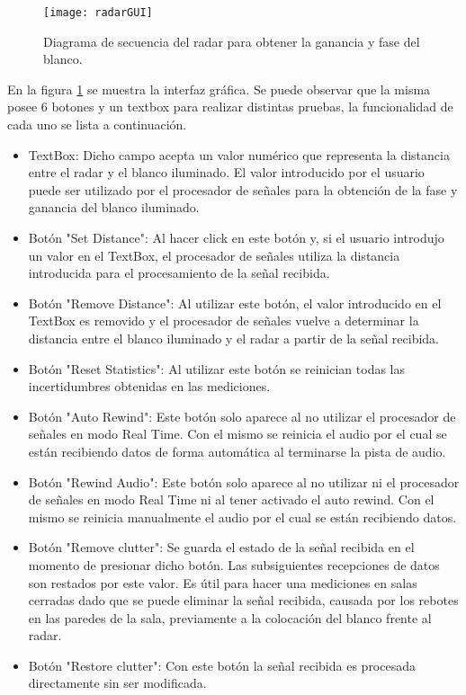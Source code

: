 \begin{figure}[htb]
 \centering
 \texttt{[image: radarGUI]}
 \caption{Diagrama de secuencia del radar para obtener la ganancia y fase del blanco.}
 \label{fig:radarSnapshot}
\end{figure}
En la figura \ref{fig:radarSnapshot} se muestra la interfaz gráfica. Se puede observar que la misma posee 6 botones y un textbox para realizar distintas pruebas, la funcionalidad de cada uno se lista a continuación.
\begin{itemize}
  \item TextBox: Dicho campo acepta un valor numérico que representa la distancia entre el radar y el blanco iluminado. El valor introducido por el usuario puede ser utilizado por el procesador de señales para la obtención de la fase y ganancia del blanco iluminado.
  \item Botón "Set Distance": Al hacer click en este botón y, si el usuario introdujo un valor en el TextBox, el procesador de señales utiliza la distancia introducida para el procesamiento de la señal recibida.
  \item Botón "Remove Distance": Al utilizar este botón, el valor introducido en el TextBox es removido y el procesador de señales vuelve a determinar la distancia entre el blanco iluminado y el radar a partir de la señal recibida.
  \item Botón "Reset Statistics": Al utilizar este botón se reinician todas las incertidumbres obtenidas en las mediciones.
  \item Botón "Auto Rewind": Este botón solo aparece al no utilizar el procesador de señales en modo Real Time. Con el mismo se reinicia el audio por el cual se están recibiendo datos de forma automática al terminarse la pista de audio.
  \item Botón "Rewind Audio": Este botón solo aparece al no utilizar ni el procesador de señales en modo Real Time ni al tener activado el auto rewind. Con el mismo se reinicia manualmente el audio por el cual se están recibiendo datos.
  \item Botón "Remove clutter": Se guarda el estado de la señal recibida en el momento de presionar dicho botón. Las subsiguientes recepciones de datos son restados por este valor. Es útil para hacer una mediciones en salas cerradas dado que se puede eliminar la señal recibida, causada por los rebotes en las paredes de la sala, previamente a la colocación del blanco frente al radar.
  \item Botón "Restore clutter": Con este botón la señal recibida es procesada directamente sin ser modificada.
\end{itemize}


